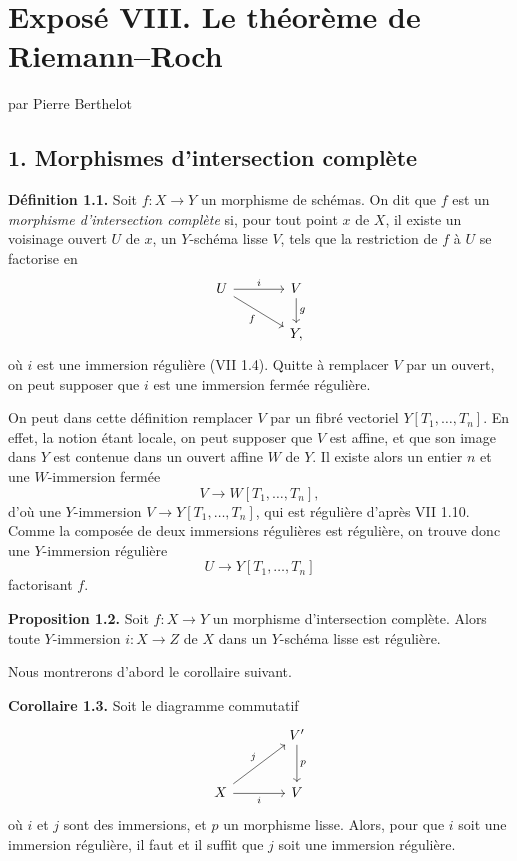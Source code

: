 \documentclass[11pt]{article}
\begin{document}
\setcounter{page}{234}

\section*{Exposé VIII. Le théorème de Riemann--Roch}
\begin{center}
par Pierre Berthelot
\end{center}

\subsection*{1. Morphismes d'intersection complète}

\textbf{Définition 1.1.} Soit $f:X\to Y$ un morphisme de schémas. On dit que $f$ est un \emph{morphisme d'intersection complète} si, pour tout point $x$ de $X$, il existe un voisinage ouvert $U$ de $x$, un $Y$-schéma lisse $V$, tels que la restriction de $f$ à $U$ se factorise en
\[
\begin{tikzcd}[column sep=large]
U \arrow[r,"i"] \arrow[dr,"f"'] & V \arrow[d,"g"]\\
& Y,
\end{tikzcd}
\]
où $i$ est une immersion régulière (VII 1.4). Quitte à remplacer $V$ par un ouvert, on peut supposer que $i$ est une immersion fermée régulière.

On peut dans cette définition remplacer $V$ par un fibré vectoriel $Y[T_1,\ldots,T_n]$. En effet, la notion étant locale, on peut supposer que $V$ est affine, et que son image dans $Y$ est contenue dans un ouvert affine $W$ de $Y$. Il existe alors un entier $n$ et une $W$-immersion fermée
\[
V\longrightarrow W[T_1,\ldots,T_n],
\]
d'où une $Y$-immersion $V\to Y[T_1,\ldots,T_n]$, qui est régulière d'après VII 1.10. Comme la composée de deux immersions régulières est régulière, on trouve donc une $Y$-immersion régulière
\[
U\longrightarrow Y[T_1,\ldots,T_n]
\]
factorisant $f$.

\textbf{Proposition 1.2.} Soit $f:X\to Y$ un morphisme d'intersection complète. Alors toute $Y$-immersion $i:X\to Z$ de $X$ dans un $Y$-schéma lisse est régulière.

Nous montrerons d'abord le corollaire suivant.

\textbf{Corollaire 1.3.} Soit le diagramme commutatif
\[
\begin{tikzcd}[column sep=large,row sep=large]
& V' \arrow[d,"p"]\\
X \arrow[ur,"j"] \arrow[r,"i"'] & V
\end{tikzcd}
\]
où $i$ et $j$ sont des immersions, et $p$ un morphisme lisse. Alors, pour que $i$ soit une immersion régulière, il faut et il suffit que $j$ soit une immersion régulière.
\end{document}
